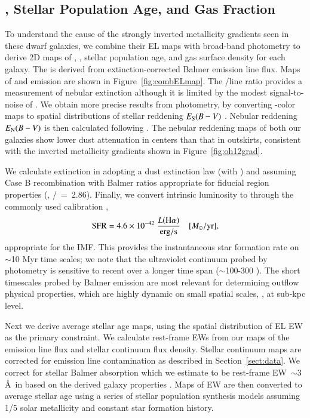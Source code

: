 \subsection{\SFR, Stellar Population Age, and Gas Fraction}\label{sect:physprop}

To understand the cause of the strongly inverted metallicity gradients seen in these dwarf galaxies,
we combine their EL maps with \hst broad-band photometry to derive 2D maps of \Mstar, \SFR,
stellar population age, and gas surface density for each galaxy.
The \SFR is derived from extinction-corrected Balmer emission line flux. Maps of \Hb and \Hg emission are shown in
Figure~\ref{fig:combELmap}. The \Hb/\Hg line ratio provides a measurement of nebular extinction although it is limited by the
modest signal-to-noise of \Hg. We obtain more precise results from \hst photometry, by converting \B-\I color maps to spatial
distributions of stellar reddening $E_{\rm S}(B-V)$ \citep{Daddi:2004hj}. Nebular reddening $E_{\rm N}(B-V)$ is then calculated
following \citet{Valentino:2017by}.  The nebular reddening maps of both our galaxies show lower dust attenuation in centers than
that in outskirts, consistent with the inverted metallicity gradients shown in Figure~\ref{fig:oh12grad}.

We calculate extinction in \Hb adopting a \citet{1989ApJ...345..245C} dust extinction law
(with ) and assuming Case B recombination with Balmer ratios appropriate for fiducial \HII region properties (\ie,
\Ha/\Hb~=~2.86).  Finally, we convert intrinsic \Ha luminosity to \SFR through the commonly used calibration
\citep{Kennicutt:1998ki},
\begin{align}
    {\rm SFR} = 4.6\times10^{-42}~ \frac{L(\textrm{H}\alpha)}{\rm erg/s} \quad [M_\odot/\textrm{yr}],
\end{align}
appropriate for the \citet{Chabrier:2003ki} IMF.
This provides the instantaneous star formation rate on $\sim$10 Myr time scales; we note that the ultraviolet continuum probed by
\hst photometry is sensitive to recent \SFR over a longer time span ($\sim$100-300 \Myr). The short timescales probed by Balmer
emission are most relevant for determining outflow physical properties, which are highly dynamic on small spatial scales, \eg, at 
sub-kpc level.

Next we derive average stellar age maps, using the spatial distribution of EL EW as the primary constraint. We
calculate \Hb rest-frame EWs from our maps of the emission line flux and stellar continuum flux density. Stellar continuum maps
are corrected for emission line contamination as described in Section~\ref{sect:data}. We correct for stellar Balmer absorption
which we estimate to be rest-frame EW~$\sim$3 \AA\ in \Hb based on the derived galaxy properties \citep{Kashino:2013ev}.  Maps of
\Hb EW are then converted to average stellar age using a series of \burst stellar population synthesis
models \citep{Leitherer:1999jt,Zanella:2015ej} assuming 1/5 solar metallicity and constant star formation history.

